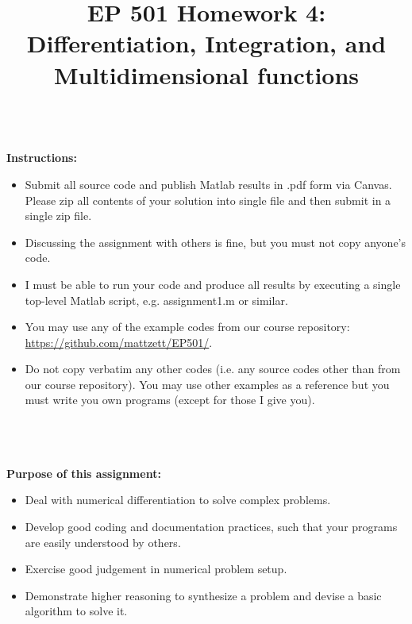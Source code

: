 \documentclass{article}
\begin{document}
\title{EP 501 Homework 4:  Differentiation, Integration, and Multidimensional functions}

\maketitle

~\\
\textbf{Instructions:}  
\begin{itemize}
  \item Submit all source code and publish Matlab results in .pdf form via Canvas.  Please zip all contents of your solution into single file and then submit in a single zip file.    
  \item Discussing the assignment with others is fine, but you must not copy anyone's code.  
  \item I must be able to run your code and produce all results by executing a single top-level Matlab script, e.g. \textsf{assignment1.m} or similar.  
  \item You may use any of the example codes from our course repository:  \url{https://github.com/mattzett/EP501/}.
  \item Do not copy verbatim any other codes (i.e. any source codes other than from our course repository).  You may use other examples as a reference but you must write you own programs (except for those I give you).  

\end{itemize}
~\\~\\~\\
\textbf{Purpose of this assignment:}  
\begin{itemize}
  \item Deal with numerical differentiation to solve complex problems.  
  \item Develop good coding and documentation practices, such that your programs are easily understood by others.  
  \item Exercise good judgement in numerical problem setup.
  \item Demonstrate higher reasoning to synthesize a problem and devise a basic algorithm to solve it.  
\end{itemize}

\pagebreak
\end{document}
